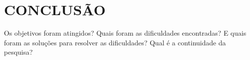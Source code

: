 \chapter{CONCLUSÃO}\par
Os objetivos foram atingidos? Quais foram as dificuldades encontradas? E quais foram as soluções para resolver as dificuldades? Qual é a continuidade da pesquisa?